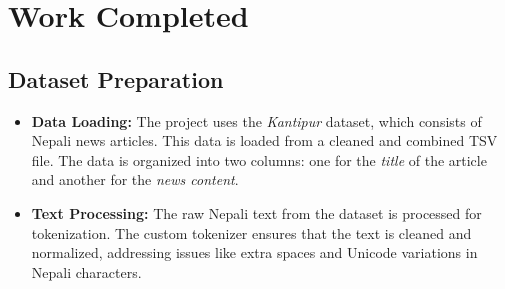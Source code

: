 \chapter{Work Completed}
\section{Dataset Preparation}
\begin{itemize}
    \item \textbf{Data Loading:} The project uses the \textit{Kantipur} dataset, which consists of Nepali news articles. This data is loaded from a cleaned and combined TSV file. The data is organized into two columns: one for the \textit{title} of the article and another for the \textit{news content}.
    \item \textbf{Text Processing:} The raw Nepali text from the dataset is processed for tokenization. The custom tokenizer ensures that the text is cleaned and normalized, addressing issues like extra spaces and Unicode variations in Nepali characters.
\end{itemize}

